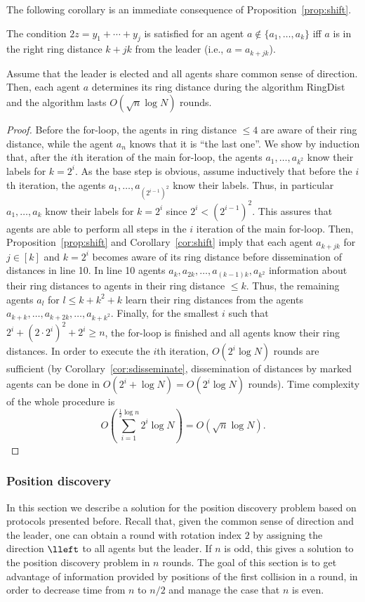 \iffull
The following corollary is an immediate consequence of Proposition~\ref{prop:shift}.
\fi
\begin{corollary}
The condition $2z=y_1+\cdots+y_j$ is satisfied for an agent $a\not\in\{a_1,\ldots,a_k\}$ iff $a$ is in the right ring distance
$k+jk$ from the leader (i.e., $a=a_{k+jk}$).
\end{corollary}

\begin{lemma}
Assume that the leader is elected and all agents share common sense of direction.
Then, each agent $a$ determines its ring distance during the algorithm RingDist and the
algorithm lasts $O(\sqrt{n}\log N)$ rounds.
\end{lemma}
\iffull
\begin{proof}
Before the for-loop, the agents in ring distance $\leq 4$ are aware of their ring distance,
while the agent $a_n$ knows that it is ``the last one''. 
We show by induction that, after the $i$th iteration of the main for-loop, the agents
$a_1,\ldots,a_{k^2}$ know their labels for $k=2^i$.
As the base step is obvious, assume inductively that before the $i$th iteration,
the agents $a_1,\ldots, a_{(2^{i-1})^2}$ know their labels. Thus, in particular
$a_1,\ldots,a_{k}$ know their labels for $k=2^i$ since $2^i<(2^{i-1})^2$.
This assures that agents are able to perform all steps in the $i$ iteration
of the main for-loop.
Then, Proposition~\ref{prop:shift}
and Corollary~\ref{cor:shift} imply that each agent
$a_{k+jk}$ for $j\in[k]$ and $k=2^i$ becomes aware of its ring distance
before dissemination of distances in line 10.
In line 10 agents $a_k,a_{2k},\ldots,a_{(k-1)k},a_{k^2}$
 information about their ring distances to agents in their ring distance
$\leq k$.
Thus, the remaining agents $a_l$ for $l\leq k+k^2+k$ learn their ring distances
from the agents $a_{k+k},\ldots,a_{k+2k},\ldots,a_{k+k^2}$.
Finally, for the smallest $i$ such that $2^i+(2\cdot 2^i)^2+2^i\geq n$, the for-loop
is finished and all agents know their ring distances.
In order to execute the $i$th iteration, $O(2^i\log N)$ rounds are sufficient
(by Corollary~\ref{cor:sdisseminate}, dissemination of distances by marked agents
can be done in $O(2^i+\log N)=O(2^i\log N)$ rounds).
Time complexity of the whole procedure is
$$O(\sum_{i=1}^{\frac12\log n} 2^i\log N)=O(\sqrt{n}\log N).$$
\end{proof}
\else
\fi

\subsubsection{Position discovery}
In this section we describe a solution for the position discovery
problem based on protocols presented before.
Recall that, given  the common sense of direction and the leader, one can obtain a round
with rotation index $2$ by assigning the direction $\lleft$ to all agents but the leader.
If $n$ is odd, this gives a solution to the position discovery problem in $n$ rounds.
The goal of this section is to get advantage of information provided by positions of 
the first collision in a round, in order to decrease time from $n$ to $n/2$ and manage
the case that $n$ is even.

